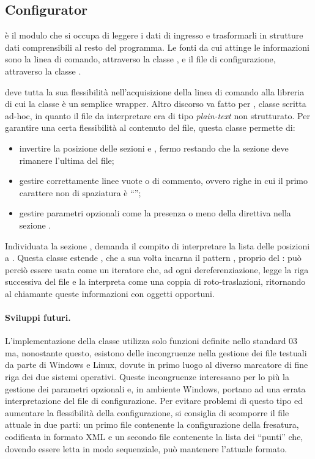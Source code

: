 \subsection{Configurator}
 è il modulo che si occupa di leggere i dati di ingresso e trasformarli in strutture dati comprensibili al resto del programma. Le fonti da cui attinge le informazioni sono la linea di comando, attraverso la classe , e il file di configurazione, attraverso la classe .

 deve tutta la sua flessibilità nell'acquisizione della linea di comando alla libreria \boost {} di cui la classe è un semplice wrapper. Altro discorso va fatto per , classe scritta ad-hoc, in quanto il file da interpretare era di tipo \emph{plain-text} non strutturato. Per garantire una certa flessibilità al contenuto del file, questa classe permette di:
\begin{itemize}
	\item invertire la posizione delle sezioni \code{[PRODUCT]} e \code{[TOOL]}, fermo restando che la sezione \code{[POINTS]} deve rimanere l'ultima del file;
	\item gestire correttamente linee vuote o di commento, ovvero righe in cui il primo carattere non di spaziatura è ``\code{#}'';
	\item gestire parametri opzionali come la presenza o meno della direttiva  nella sezione \code{[TOOL]}.
\end{itemize}
Individuata la sezione \code{[POINTS]},  demanda il compito di interpretare la lista delle posizioni a . Questa classe estende , che a sua volta incarna il pattern , proprio del \cpp: può perciò essere usata come un iteratore che, ad ogni dereferenziazione, legge la riga successiva del file e la interpreta come una coppia di roto-traslazioni, ritornando al chiamante queste informazioni con oggetti opportuni.

\paragraph{Sviluppi futuri.}
L'implementazione della classe  utilizza solo funzioni definite nello standard \cpp{}03 ma, nonostante questo, esistono delle incongruenze nella gestione dei file testuali da parte di Windows e Linux, dovute in primo luogo al diverso marcatore di fine riga dei due sistemi operativi. Queste incongruenze interessano per lo più la gestione dei parametri opzionali e, in ambiente Windows, portano ad una errata interpretazione del file di configurazione. Per evitare problemi di questo tipo ed aumentare la flessibilità della configurazione, si consiglia di scomporre il file attuale in due parti: un primo file contenente la configurazione della fresatura, codificata in formato XML e un secondo file contenente la lista dei ``punti'' che, dovendo essere letta in modo sequenziale, può mantenere l'attuale formato.
